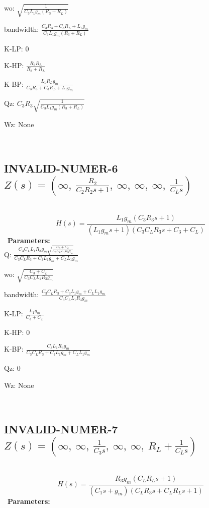 \documentclass{article}
\begin{document}
wo: $\sqrt{\frac{1}{C_{3} L_{1} g_{m} \left(R_{3} + R_{L}\right)}}$\ 

bandwidth: $\frac{C_{3} R_{3} + C_{3} R_{L} + L_{1} g_{m}}{C_{3} L_{1} g_{m} \left(R_{3} + R_{L}\right)}$\ 

K-LP: $0$\ 

K-HP: $\frac{R_{3} R_{L}}{R_{3} + R_{L}}$\ 

K-BP: $\frac{L_{1} R_{L} g_{m}}{C_{3} R_{3} + C_{3} R_{L} + L_{1} g_{m}}$\ 

Qz: $C_{3} R_{3} \sqrt{\frac{1}{C_{3} L_{1} g_{m} \left(R_{3} + R_{L}\right)}}$\ 

Wz: $\text{None}$\ 

\ 

\subsection{INVALID-NUMER-6 $Z(s) = \left( \infty, \  \frac{R_{2}}{C_{2} R_{2} s + 1}, \  \infty, \  \infty, \  \infty, \  \frac{1}{C_{L} s}\right)$ } \ 
\textbf{\[H(s) = \frac{L_{1} g_{m} \left(C_{3} R_{3} s + 1\right)}{\left(L_{1} g_{m} s + 1\right) \left(C_{3} C_{L} R_{3} s + C_{3} + C_{L}\right)}\] } \ 
\textbf{Parameters:}\\ 

Q: $\frac{C_{3} C_{L} L_{1} R_{3} g_{m} \sqrt{\frac{C_{3} + C_{L}}{C_{3} C_{L} L_{1} R_{3} g_{m}}}}{C_{3} C_{L} R_{3} + C_{3} L_{1} g_{m} + C_{L} L_{1} g_{m}}$\ 

wo: $\sqrt{\frac{C_{3} + C_{L}}{C_{3} C_{L} L_{1} R_{3} g_{m}}}$\ 

bandwidth: $\frac{C_{3} C_{L} R_{3} + C_{3} L_{1} g_{m} + C_{L} L_{1} g_{m}}{C_{3} C_{L} L_{1} R_{3} g_{m}}$\ 

K-LP: $\frac{L_{1} g_{m}}{C_{3} + C_{L}}$\ 

K-HP: $0$\ 

K-BP: $\frac{C_{3} L_{1} R_{3} g_{m}}{C_{3} C_{L} R_{3} + C_{3} L_{1} g_{m} + C_{L} L_{1} g_{m}}$\ 

Qz: $0$\ 

Wz: $\text{None}$\ 

\ 

\subsection{INVALID-NUMER-7 $Z(s) = \left( \infty, \  \infty, \  \frac{1}{C_{3} s}, \  \infty, \  \infty, \  R_{L} + \frac{1}{C_{L} s}\right)$ } \ 
\textbf{\[H(s) = \frac{R_{3} g_{m} \left(C_{L} R_{L} s + 1\right)}{\left(C_{1} s + g_{m}\right) \left(C_{L} R_{3} s + C_{L} R_{L} s + 1\right)}\] } \ 
\textbf{Parameters:}\\ 
\end{document}
